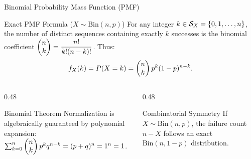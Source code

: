 \documentclass[aspectratio=169,xcolor={dvipsnames,table}]{beamer}
\begin{document}
\begin{frame}{Binomial Probability Mass Function (PMF)}
	\begin{block}{Exact PMF Formula ($X \sim \text{Bin}(n, p)$)}
		\small
		For any integer $k \in \mathcal{S}_X = \left\{ 0, 1, \dots, n \right\}$, the number of distinct sequences containing exactly $k$ successes is the binomial coefficient $\begin{pmatrix} n \\ k \end{pmatrix} = \dfrac{n!}{k!(n-k)!}$. Thus:
		\begin{align*}
			f_X(k) = P(X = k) = \begin{pmatrix} n \\ k \end{pmatrix} p^k (1-p)^{n-k}.
		\end{align*}
	\end{block}
	\vspace{-0.15cm}
	\begin{columns}[T]
		\begin{column}{0.48\textwidth}
			\begin{exampleblock}{Binomial Theorem}
				\footnotesize
				Normalization is algebraically guaranteed by polynomial expansion:
				$\sum_{k=0}^n \begin{pmatrix} n \\ k \end{pmatrix} p^k q^{n-k} = (p+q)^n = 1^n = 1$.
			\end{exampleblock}
		\end{column}
		\begin{column}{0.48\textwidth}
			\begin{alertblock}{Combinatorial Symmetry}
				\footnotesize
				If $X \sim \text{Bin}(n, p)$, the failure count $n-X$ follows an exact $\text{Bin}(n, 1-p)$ distribution.
			\end{alertblock}
		\end{column}
	\end{columns}
\end{frame}
\end{document}
